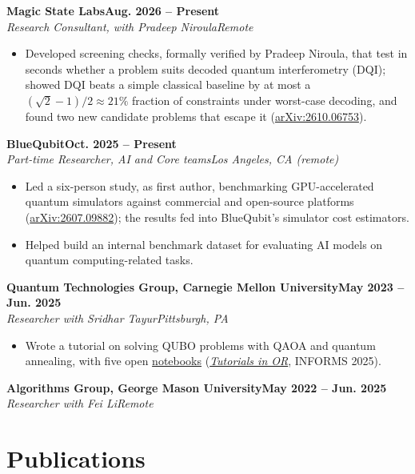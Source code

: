 \documentclass[letterpaper,10pt]{article}
\newcommand{\entry}[4]{%
  \par\vspace{3pt}\noindent\textbf{#1}\hfill\textbf{\small #2}\\
  \textit{\small #3}\hfill\textit{\small #4}\par}
\begin{document}
\entry{Magic State Labs}{Aug. 2026 -- Present}{Research Consultant, with Pradeep Niroula}{Remote}
\begin{itemize}\small
  \item Developed screening checks, formally verified by Pradeep Niroula, that test in seconds whether a problem suits decoded quantum interferometry (DQI); showed DQI beats a simple classical baseline by at most a $(\sqrt{2}-1)/2 \approx 21\%$ fraction of constraints under worst-case decoding, and found two new candidate problems that escape it (\href{https://arxiv.org/abs/2610.06753}{arXiv:2610.06753}).
\end{itemize}

\entry{BlueQubit}{Oct. 2025 -- Present}{Part-time Researcher, AI and Core teams}{Los Angeles, CA (remote)}
\begin{itemize}\small
  \item Led a six-person study, as first author, benchmarking GPU-accelerated quantum simulators against commercial and open-source platforms
  (\href{https://arxiv.org/abs/2607.09882}{arXiv:2607.09882}); the results fed into BlueQubit's simulator cost estimators.
  \item Helped build an internal benchmark dataset for evaluating AI models on quantum computing-related tasks.
\end{itemize}

\entry{Quantum Technologies Group, Carnegie Mellon University}{May 2023 -- Jun. 2025}{Researcher with Sridhar Tayur}{Pittsburgh, PA}
\begin{itemize}\small
  \item Wrote a tutorial on solving QUBO problems with QAOA and quantum annealing, with five open
  \href{https://github.com/arulrhikm/Solving-QUBOs-on-Quantum-Computers}{notebooks} (\href{https://pubsonline.informs.org/doi/abs/10.1287/educ.2025.0288}{\textit{Tutorials in OR}}, INFORMS 2025).
\end{itemize}

\entry{Algorithms Group, George Mason University}{May 2022 -- Jun. 2025}{Researcher with Fei Li}{Remote}

\section{Publications}
\small
\end{document}
